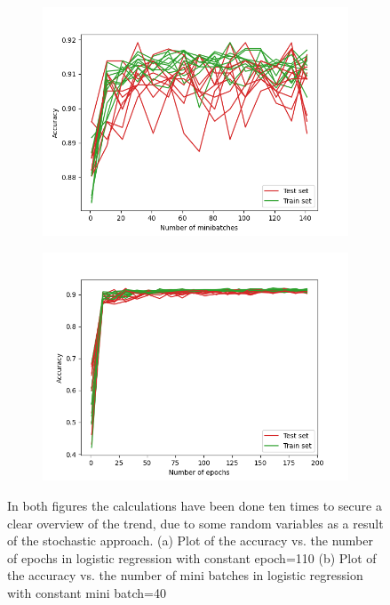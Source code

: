 \documentclass[../main.tex]{subfiles}
\begin{document}
\begin{figure}[!htb] 
   \centering
   \begin{subfigure}[b]{0.80\textwidth}
      \centering
    \includegraphics[width=\textwidth]{../assets/acc_vs_mb_set_40.png}
    \caption{}
    \label{fig:accvsepoch}
   \end{subfigure}
   \quad
   \begin{subfigure}[b]{0.80\textwidth}
    \centering
    \includegraphics[width=\textwidth]{../assets/acc_vs_epoch_set_110.png} 
    \caption{}
    \label{fig:accvsmini}
   \end{subfigure}
   \caption{In both figures the calculations have been done ten times to secure a clear overview of the trend, due to some random variables as a result of the stochastic approach. (a) Plot of the accuracy vs. the number of epochs in logistic regression with constant epoch=110 (b) Plot of the accuracy vs. the number of mini batches in logistic regression with constant mini batch=40
   }
   \label{fig:accvsepochvsmb}
\end{figure} 
\end{document}
